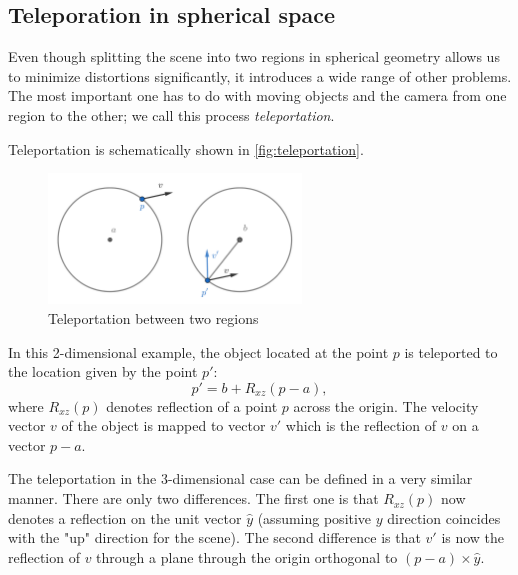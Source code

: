 \subsection{Teleporation in spherical space} \label{sub:teleportation}
Even though splitting the scene into two regions in spherical geometry allows us to minimize distortions significantly, it introduces a wide range of other problems.
The most important one has to do with moving objects and the camera from one region to the other; we call this process \textit{teleportation}.

Teleportation is schematically shown in \autoref{fig:teleportation}.
\begin{figure}[h]
    \centering
    \includegraphics[width=0.6\textwidth]{chapters/theoretical_foundations/sections/non-eudlidean-spaces/resources/teleportation.png}
    \caption{Teleportation between two regions}
    \label{fig:teleportation}
\end{figure}
In this 2-dimensional example, the object located at the point $p$ is teleported to the location given by the point $p'$:
\begin{equation*}
    p' = b + R_{xz}(p - a),
\end{equation*}
where $R_{xz}(p)$ denotes reflection of a point $p$ across the origin.
The velocity vector $v$ of the object is mapped to vector $v'$ which is the reflection of $v$ on a vector $p - a$.

The teleportation in the 3-dimensional case can be defined in a very similar manner.
There are only two differences.
The first one is that $R_{xz}(p)$ now denotes a reflection on the unit vector $\hat{y}$ (assuming positive $y$ direction coincides with the "up" direction for the scene).
The second difference is that $v'$ is now the reflection of $v$ through a plane through the origin orthogonal to $(p - a) \times \hat{y}$.